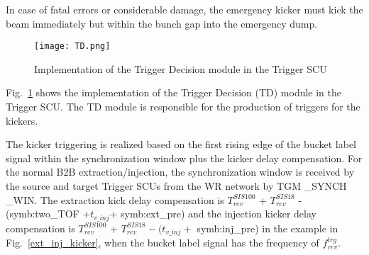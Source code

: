 In case of fatal errors or considerable damage, the emergency kicker must kick the beam immediately but within the bunch gap into the emergency dump.



%
 \begin{figure}[!htb]
   \centering   
   \texttt{[image: TD.png]}
   \caption{Implementation of the Trigger Decision module in the Trigger SCU}
   \label{TD}
\end{figure}
Fig.~\ref{TD} shows the implementation of the Trigger Decision (TD) module in the Trigger SCU.  The TD module is responsible for the production of triggers for the kickers. 

The kicker triggering is realized based on the first rising edge of the bucket label signal within the synchronization window plus the kicker delay compensation. For the normal B2B extraction/injection, the synchronization window is received by the source and target Trigger SCUs from the WR network by TGM \_SYNCH \_WIN. The extraction kick delay compensation is $T_{\mathit{rev}}^{\mathit{SIS100}}$ + $T_{\mathit{rev}}^{\mathit{SIS18}}$ -(\gls{symb:two_TOF} +$ t_{v\_inj}$+ \gls{symb:ext_pre}) and the injection kicker delay compensation is $T_{\mathit{rev}}^{\mathit{SIS100}}$ + $T_{\mathit{rev}}^{\mathit{SIS18}} - (t_{v\_inj}+$ \gls{symb:inj_pre}) in the example in Fig.~\ref{ext_inj_kicker}, when the bucket label signal has the frequency of $f_{\mathit{rev}}^{\mathit{trg}}$. 

